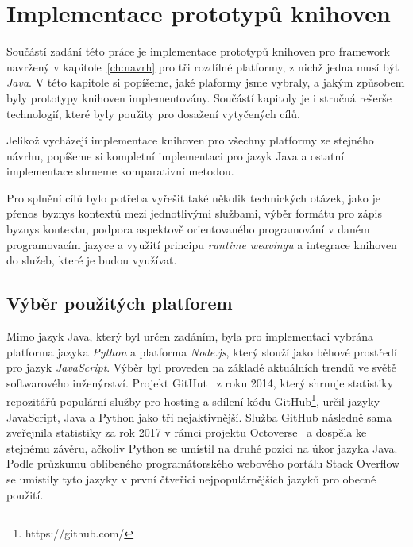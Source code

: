 \usepackage[T1]{fontenc}
\usepackage[utf8]{inputenc}


\chapter{Implementace prototypů knihoven}\label{ch:implementace}

Součástí zadání této práce je implementace prototypů
knihoven pro framework navržený v kapitole~\ref{ch:navrh}
pro tři rozdílné platformy, z nichž jedna musí být \textit{Java}.
V této kapitole si popíšeme, jaké plaformy jsme vybraly, a jakým
způsobem byly prototypy knihoven implementovány. Součástí
kapitoly je i stručná rešerše technologií, které byly použity
pro dosažení vytyčených cílů.

Jelikož vycházejí implementace knihoven pro všechny platformy
ze stejného návrhu, popíšeme si kompletní implementaci pro jazyk
Java a ostatní implementace shrneme komparativní metodou.

Pro splnění cílů bylo potřeba vyřešit také několik technických otázek,
jako je přenos byznys kontextů mezi jednotlivými službami, výběr formátu
pro zápis byznys kontextu, podpora aspektově orientovaného programování
v daném programovacím jazyce a využití principu \textit{runtime weavingu}
a integrace knihoven do služeb, které je budou využívat.

\section{Výběr použitých platforem}

Mimo jazyk Java, který byl určen zadáním, byla pro
implementaci vybrána platforma jazyka \textit{Python}
a platforma \textit{Node.js}, který slouží jako
běhové prostředí pro jazyk \textit{JavaScript}.
Výběr byl proveden na základě aktuálních trendů
ve světě softwarového inženýrství. Projekt GitHut~\cite{githut}
z roku 2014, který shrnuje statistiky repozitářů
populární služby pro hosting a sdílení kódu
GitHub\footnote{https://github.com/}, určil
jazyky JavaScript, Java a Python jako tři nejaktivnější.
Služba GitHub následně sama zveřejnila statistiky za rok 2017
v rámci projektu Octoverse~\cite{octoverse}
a dospěla ke stejnému závěru, ačkoliv Python se umístil na druhé
pozici na úkor jazyka Java. Podle průzkumu oblíbeného
programátorského webového portálu Stack
Overflow~\cite{stackoverflowsurvey} se umístily tyto jazyky
v první čtveřici nejpopulárnějších jazyků pro obecné použití.

